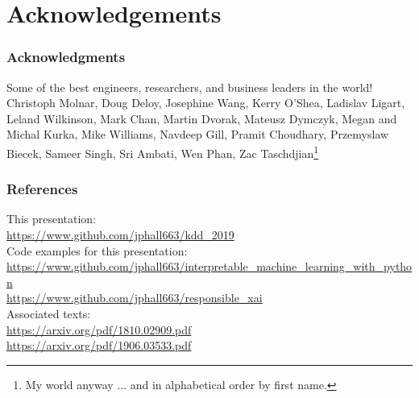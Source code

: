 \documentclass[11pt,
               aspectratio=169,
               hyperref={colorlinks}
               ]{beamer}
\begin{document}
		
\section{Acknowledgements} 

	\begin{frame}
	
		\frametitle{Acknowledgments}
		
		Some of the best engineers, researchers, and business leaders in the world!\\
		\vspace{10pt}
		Christoph Molnar, Doug Deloy, Josephine Wang, Kerry O'Shea, Ladislav Ligart, Leland Wilkinson, Mark Chan, Martin Dvorak, Mateusz Dymczyk, Megan and Michal Kurka, Mike Williams, Navdeep Gill, Pramit Choudhary, Przemyslaw Biecek, Sameer Singh, Sri Ambati, Wen Phan, Zac Taschdjian\footnote{\tiny{My world anyway ... and in alphabetical order by first name.}}

	\end{frame}	
			


	\begin{frame}[t, allowframebreaks]
	
		\frametitle{References}	
		
			This presentation:\\
			\scriptsize{\url{https://www.github.com/jphall663/kdd_2019}}\\
			\vspace{10pt}
			\normalsize Code examples for this presentation:\\
			\scriptsize{\url{https://www.github.com/jphall663/interpretable_machine_learning_with_python}}\\
			\noindent\scriptsize{\url{https://www.github.com/jphall663/responsible_xai}}\\
			\vspace{10pt}
			\normalsize Associated texts:\\
			\scriptsize{\url{https://arxiv.org/pdf/1810.02909.pdf}}\\
			\noindent\scriptsize{\url{https://arxiv.org/pdf/1906.03533.pdf}}
								
		\framebreak		
		
		\tiny
		\printbibliography
		
	\end{frame}
\end{document}
